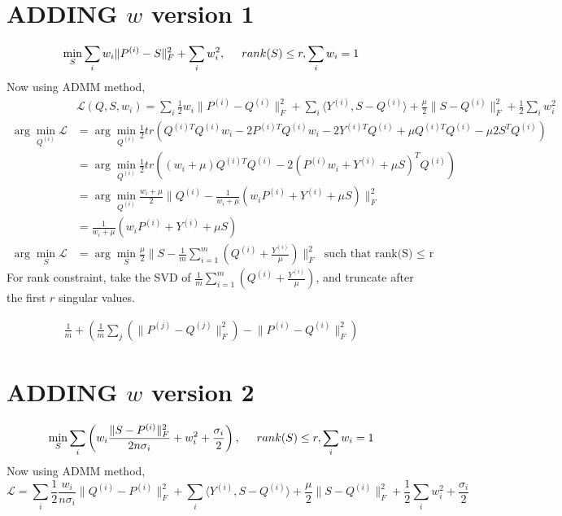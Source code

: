 \documentclass[11pt]{article}
\begin{document}
\section*{ADDING $w$ version 1}
$$\min_S \sum_i w_i \|P^{(i)} - S\|^2_F + \sum_i w_i^2, \hspace{5mm}rank(S) \leq r, \sum_i w_i = 1$$
Now using ADMM method,
\begin{align*}
&\mathcal{L}(Q,S,w_i) = \sum_i \frac{1}{2} w_i \|P^{(i)}  - Q^{(i)} \|_F^2 + \sum_i \langle Y^{(i)}, S-Q^{(i)} \rangle + \frac{\mu}{2} \|S-Q^{(i)}\|_F^2 + \frac{1}{2} \sum_i w_i^2\\
\arg \min_{Q^{(i)}} \mathcal{L} & = \arg \min_{Q^{(i)}} \frac{1}{2} tr\left(Q^{(i)T} Q^{(i)} w_i - 2P^{(i)T}Q^{(i)} w_i - 2Y^{(i)T}Q^{(i)} + \mu Q^{(i)T}Q^{(i)} - \mu 2S^T Q^{(i)}\right)\\
&=\arg \min_{Q^{(i)}} \frac{1}{2} tr \left( 
(w_i + \mu) Q^{(i)T}Q^{(i)} - 2(P^{(i)} w_i + Y^{(i)} + \mu S)^T Q^{(i)}
\right)\\
& =\arg \min_{Q^{(i)}} \frac{w_i + \mu}{2} \|Q^{(i)} - \frac{1}{w_i + \mu} (w_i P^{(i)}+ Y^{(i)} + \mu S ) \|_F^2\\
& =\frac{1}{w_i + \mu} (w_i P^{(i)} + Y^{(i)} + \mu S )\\
\arg \min_S  \mathcal{L} &= \arg \min _S \frac{\mu}{2} \|S - \frac{1}{m} \sum_{i=1}^{m} (Q^{(i)} + \frac{Y^{(i)}}{\mu}) \|_F^2 \text{   such that rank(S) $\leq$ r}
\end{align*}
For rank constraint, take the SVD of $\frac{1}{m}  \sum_{i=1}^{m} (Q^{(i)} + \frac{Y^{(i)}}{\mu})$, and truncate after the first $r$ singular values.

\begin{align*}
 \frac{1}{m} + \left(
\frac{1}{m} \sum_j \left({\|P^{(j)} - Q^{(j)}\|_F^2}\right)-
{\|P^{(i)} - Q^{(i)}\|_F^2}
\right)
\end{align*}

\pagebreak

\section*{ADDING $w$ version 2}
$$\min_S \sum_i \left(w_i \frac{\|S-P^{(i)}\|^2_F}{2n\sigma_i} + w_i^2 + \frac{\sigma_i}{2}\right), \hspace{5mm}rank(S) \leq r, \sum_i w_i = 1$$
Now using ADMM method,
$$\mathcal{L} = \sum_i \frac{1}{2} \frac{w_i}{n\sigma_i} \|Q^{(i)}-P^{(i)} \|_F^2 + \sum_i \langle Y^{(i)}, S-Q^{(i)} \rangle + \frac{\mu}{2} \|S - Q^{(i)}\|_F^2 + \frac{1}{2} \sum_i w_i^2 + \frac{\sigma_i}{2}$$
\end{document}
